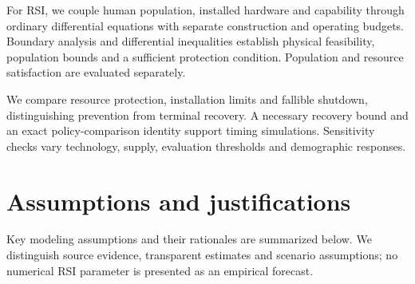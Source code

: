 \documentclass[12pt,a4paper]{article}
\theoremstyle{remark}
\begin{document}
For RSI, we couple human population, installed hardware and capability through ordinary differential equations with separate construction and operating budgets. Boundary analysis and differential inequalities establish physical feasibility, population bounds and a sufficient protection condition. Population and resource satisfaction are evaluated separately.

We compare resource protection, installation limits and fallible shutdown, distinguishing prevention from terminal recovery. A necessary recovery bound and an exact policy-comparison identity support timing simulations. Sensitivity checks vary technology, supply, evaluation thresholds and demographic responses.

\section{Assumptions and justifications}\label{sec:assumptions}
Key modeling assumptions and their rationales are summarized below. We distinguish source evidence, transparent estimates and scenario assumptions; no numerical RSI parameter is presented as an empirical forecast.
\end{document}
